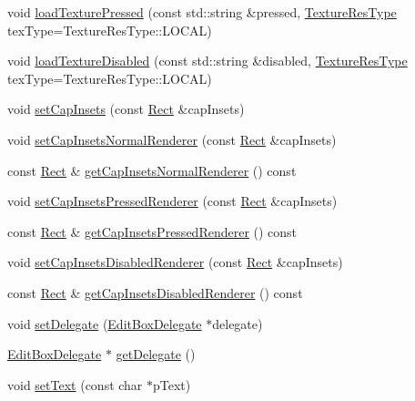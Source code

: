 \begin{DoxyCompactItemize}
\item 
void \hyperlink{classui_1_1EditBox_abbe0278d18373f9d819066504aaa15ed}{load\+Texture\+Pressed} (const std\+::string \&pressed, \hyperlink{classui_1_1Widget_a040a65ec5ad3b11119b7e16b98bd9af0}{Texture\+Res\+Type} tex\+Type=Texture\+Res\+Type\+::\+L\+O\+C\+AL)
\item 
void \hyperlink{classui_1_1EditBox_afe94af506888eab257504bf408b5692d}{load\+Texture\+Disabled} (const std\+::string \&disabled, \hyperlink{classui_1_1Widget_a040a65ec5ad3b11119b7e16b98bd9af0}{Texture\+Res\+Type} tex\+Type=Texture\+Res\+Type\+::\+L\+O\+C\+AL)
\item 
void \hyperlink{classui_1_1EditBox_ad02e9879fd52ed960df901a017bde1ff}{set\+Cap\+Insets} (const \hyperlink{classRect}{Rect} \&cap\+Insets)
\item 
void \hyperlink{classui_1_1EditBox_a9500ec04f104bd549423336a8409a1c3}{set\+Cap\+Insets\+Normal\+Renderer} (const \hyperlink{classRect}{Rect} \&cap\+Insets)
\item 
const \hyperlink{classRect}{Rect} \& \hyperlink{classui_1_1EditBox_afa9dc82a953be1cae1a1436e868bd459}{get\+Cap\+Insets\+Normal\+Renderer} () const
\item 
void \hyperlink{classui_1_1EditBox_a724b6951bf411a903a92b5cc4aa96afe}{set\+Cap\+Insets\+Pressed\+Renderer} (const \hyperlink{classRect}{Rect} \&cap\+Insets)
\item 
const \hyperlink{classRect}{Rect} \& \hyperlink{classui_1_1EditBox_a3cc0390e788f6b8da345877c424d0c1d}{get\+Cap\+Insets\+Pressed\+Renderer} () const
\item 
void \hyperlink{classui_1_1EditBox_a1167aa7788554bfd537f58ecaca5adc0}{set\+Cap\+Insets\+Disabled\+Renderer} (const \hyperlink{classRect}{Rect} \&cap\+Insets)
\item 
const \hyperlink{classRect}{Rect} \& \hyperlink{classui_1_1EditBox_aeb3e0e78e2dcb8ffd4fe78dd509c56fe}{get\+Cap\+Insets\+Disabled\+Renderer} () const
\item 
void \hyperlink{classui_1_1EditBox_a6a6cd93d4204d3415483c4d531646409}{set\+Delegate} (\hyperlink{classui_1_1EditBoxDelegate}{Edit\+Box\+Delegate} $\ast$delegate)
\item 
\hyperlink{classui_1_1EditBoxDelegate}{Edit\+Box\+Delegate} $\ast$ \hyperlink{classui_1_1EditBox_a46e2b844d36d0142344be742508718a5}{get\+Delegate} ()
\item 
void \hyperlink{classui_1_1EditBox_aab808bfc3f2e2ab7553f23b35002dfb7}{set\+Text} (const char $\ast$p\+Text)
\item 

\end{DoxyCompactItemize}
